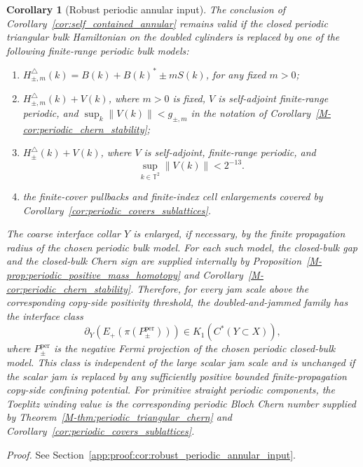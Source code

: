 \documentclass[11pt]{article}
\numberwithin{equation}{section}
\newtheorem{corollary}[theorem]{Corollary}
\theoremstyle{definition}
\theoremstyle{remark}
\newcommand{\proofref}[1]{%
  \par\noindent\emph{Proof.} See Section~\ref{#1}.\par\medskip
}
\newcommand{\proofappendixref}[1]{\proofref{#1}}
\newcommand{\opnorm}[1]{\left\lVert#1\right\rVert}
\begin{document}
\begin{corollary}[Robust periodic annular input]\label{cor:robust_periodic_annular_input}
The conclusion of Corollary~\ref{cor:self_contained_annular} remains valid if the closed periodic
triangular bulk Hamiltonian on the doubled cylinders is replaced by one of the following
finite-range periodic bulk models:
\begin{enumerate}[label=(\roman*),leftmargin=2em]
\item \(H_{\pm,m}^\triangle(k)=B(k)+B(k)^*\pm mS(k)\), for any fixed \(m>0\);
\item \(H_{\pm,m}^\triangle(k)+V(k)\), where \(m>0\) is fixed, \(V\) is self-adjoint finite-range
periodic, and \(\sup_k\opnorm{V(k)}<g_{\pm,m}\) in the notation of
Corollary~\ref{M-cor:periodic_chern_stability};
\item \(H_\pm^\triangle(k)+V(k)\), where \(V\) is self-adjoint, finite-range periodic, and
\[
\sup_{k\in\mathbb T^2}\opnorm{V(k)}<2^{-13}.
\]
\item the finite-cover pullbacks and finite-index cell enlargements covered by
Corollary~\ref{cor:periodic_covers_sublattices}.
\end{enumerate}
The coarse interface collar \(Y\) is enlarged, if necessary, by the finite propagation radius of
the chosen periodic bulk model.
For each such model, the closed-bulk gap and the closed-bulk Chern sign are supplied internally by
Proposition~\ref{M-prop:periodic_positive_mass_homotopy} and
Corollary~\ref{M-cor:periodic_chern_stability}. Therefore, for every jam scale above the corresponding
copy-side positivity threshold, the doubled-and-jammed family has the interface class
\[
\partial_Y(E_+(\pi(P_\pm^{\mathrm{per}})))\in K_1(C^*(Y\subset X)),
\]
where \(P_\pm^{\mathrm{per}}\) is the negative Fermi projection of the chosen periodic closed-bulk
model.
This class is independent of the large scalar jam scale and is unchanged if the scalar jam is
replaced by any sufficiently positive bounded finite-propagation copy-side confining potential.
For primitive straight periodic components, the Toeplitz winding value is the corresponding
periodic Bloch Chern number supplied by Theorem~\ref{M-thm:periodic_triangular_chern} and
Corollary~\ref{cor:periodic_covers_sublattices}.
\end{corollary}
\proofappendixref{app:proof:cor:robust_periodic_annular_input}
\end{document}
